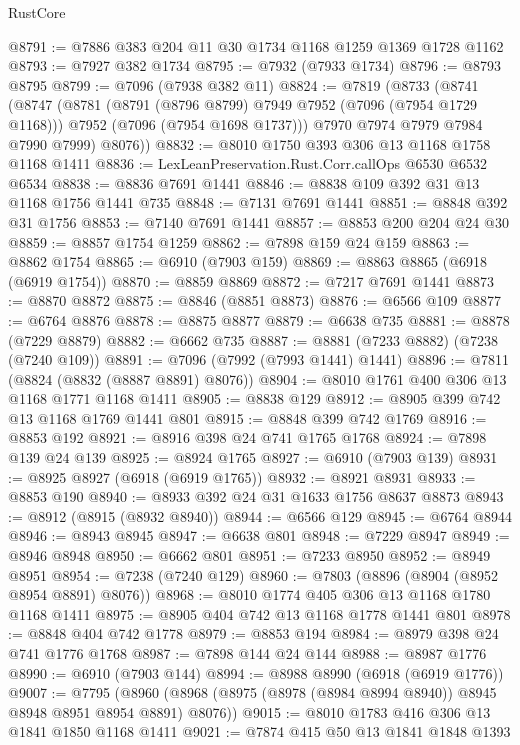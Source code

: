 \begin{lexlean}{RustCore}
\begin{coremodule}
@8791 := @7886 @383 @204 @11 @30 @1734 @1168 @1259 @1369 @1728 @1162
@8793 := @7927 @382 @1734
@8795 := @7932 (@7933 @1734)
@8796 := @8793 @8795
@8799 := @7096 (@7938 @382 @11)
@8824 := @7819
    (@8733
      (@8741
        (@8747
          (@8781
            (@8791 (@8796 @8799) @7949 @7952 (@7096 (@7954 @1729 @1168)))
            @7952
            (@7096 (@7954 @1698 @1737)))
          @7970
          @7974
          @7979
          @7984
          @7990
          @7999)
        @8076))
@8832 := @8010 @1750 @393 @306 @13 @1168 @1758 @1168 @1411
@8836 := LexLeanPreservation.Rust.Corr.callOps @6530 @6532 @6534
@8838 := @8836 @7691 @1441
@8846 := @8838 @109 @392 @31 @13 @1168 @1756 @1441 @735
@8848 := @7131 @7691 @1441
@8851 := @8848 @392 @31 @1756
@8853 := @7140 @7691 @1441
@8857 := @8853 @200 @204 @24 @30
@8859 := @8857 @1754 @1259
@8862 := @7898 @159 @24 @159
@8863 := @8862 @1754
@8865 := @6910 (@7903 @159)
@8869 := @8863 @8865 (@6918 (@6919 @1754))
@8870 := @8859 @8869
@8872 := @7217 @7691 @1441
@8873 := @8870 @8872
@8875 := @8846 (@8851 @8873)
@8876 := @6566 @109
@8877 := @6764 @8876
@8878 := @8875 @8877
@8879 := @6638 @735
@8881 := @8878 (@7229 @8879)
@8882 := @6662 @735
@8887 := @8881 (@7233 @8882) (@7238 (@7240 @109))
@8891 := @7096 (@7992 (@7993 @1441) @1441)
@8896 := @7811 (@8824 (@8832 (@8887 @8891) @8076))
@8904 := @8010 @1761 @400 @306 @13 @1168 @1771 @1168 @1411
@8905 := @8838 @129
@8912 := @8905 @399 @742 @13 @1168 @1769 @1441 @801
@8915 := @8848 @399 @742 @1769
@8916 := @8853 @192
@8921 := @8916 @398 @24 @741 @1765 @1768
@8924 := @7898 @139 @24 @139
@8925 := @8924 @1765
@8927 := @6910 (@7903 @139)
@8931 := @8925 @8927 (@6918 (@6919 @1765))
@8932 := @8921 @8931
@8933 := @8853 @190
@8940 := @8933 @392 @24 @31 @1633 @1756 @8637 @8873
@8943 := @8912 (@8915 (@8932 @8940))
@8944 := @6566 @129
@8945 := @6764 @8944
@8946 := @8943 @8945
@8947 := @6638 @801
@8948 := @7229 @8947
@8949 := @8946 @8948
@8950 := @6662 @801
@8951 := @7233 @8950
@8952 := @8949 @8951
@8954 := @7238 (@7240 @129)
@8960 := @7803 (@8896 (@8904 (@8952 @8954 @8891) @8076))
@8968 := @8010 @1774 @405 @306 @13 @1168 @1780 @1168 @1411
@8975 := @8905 @404 @742 @13 @1168 @1778 @1441 @801
@8978 := @8848 @404 @742 @1778
@8979 := @8853 @194
@8984 := @8979 @398 @24 @741 @1776 @1768
@8987 := @7898 @144 @24 @144
@8988 := @8987 @1776
@8990 := @6910 (@7903 @144)
@8994 := @8988 @8990 (@6918 (@6919 @1776))
@9007 := @7795
    (@8960 (@8968 (@8975 (@8978 (@8984 @8994 @8940)) @8945 @8948 @8951 @8954 @8891) @8076))
@9015 := @8010 @1783 @416 @306 @13 @1841 @1850 @1168 @1411
@9021 := @7874 @415 @50 @13 @1841 @1848 @1393

\end{coremodule}
\end{lexlean}
